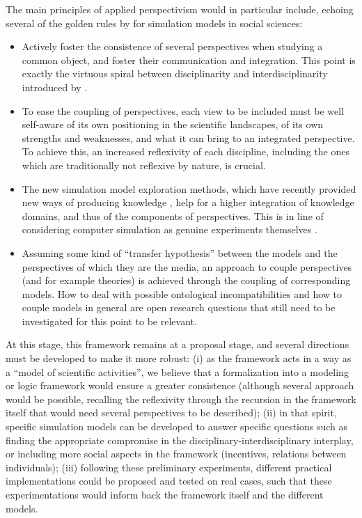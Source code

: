 The main principles of applied perspectivism would in particular include, echoing several of the golden rules by \cite{banos2013pour} for simulation models in social sciences:

\begin{itemize}
	\item Actively foster the consistence of several perspectives when studying a common object, and foster their communication and integration. This point is exactly the virtuous spiral between disciplinarity and interdisciplinarity introduced by \cite{banos2013pour}.
	\item To ease the coupling of perspectives, each view to be included must be well self-aware of its own positioning in the scientific landscapes, of its own strengths and weaknesses, and what it can bring to an integrated perspective. To achieve this, an increased reflexivity of each discipline, including the ones which are traditionally not reflexive by nature, is crucial.
	\item The new simulation model exploration methods, which have recently provided new ways of producing knowledge \cite{pumain2017urban}, help for a higher integration of knowledge domains, and thus of the components of perspectives. This is in line of considering computer simulation as genuine experiments themselves \cite{boge2019computer}.
	\item Assuming some kind of ``transfer hypothesis'' between the models and the perspectives of which they are the media, an approach to couple perspectives (and for example theories) is achieved through the coupling of corresponding models. How to deal with possible ontological incompatibilities and how to couple models in general are open research questions that still need to be investigated for this point to be relevant.
\end{itemize}


At this stage, this framework remains at a proposal stage, and several directions must be developed to make it more robust: (i) as the framework acts in a way as a ``model of scientific activities'', we believe that a formalization into a modeling or logic framework would ensure a greater consistence (although several approach would be possible, recalling the reflexivity through the recursion in the framework itself that would need several perspectives to be described); (ii) in that spirit, specific simulation models can be developed to answer specific questions such as finding the appropriate compromise in the disciplinary-interdisciplinary interplay, or including more social aspects in the framework (incentives, relations between individuals); (iii) following these preliminary experiments, different practical implementations could be proposed and tested on real cases, such that these experimentations would inform back the framework itself and the different models.


